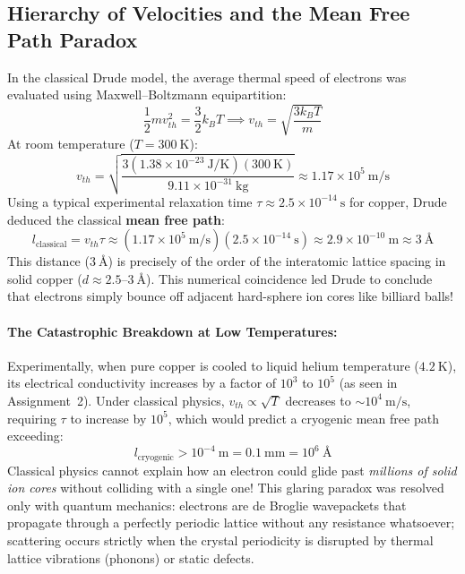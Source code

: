 \documentclass[11pt,a4paper]{article}
\begin{document}
\subsection{Hierarchy of Velocities and the Mean Free Path Paradox}
In the classical Drude model, the average thermal speed of electrons was evaluated using Maxwell--Boltzmann equipartition:
\begin{equation}
\frac{1}{2}m v_{th}^2 = \frac{3}{2}k_B T \implies v_{th} = \sqrt{\frac{3k_B T}{m}}
\label{eq:v_th}
\end{equation}
At room temperature ($T = 300\ \mathrm{K}$):
\begin{equation}
v_{th} = \sqrt{\frac{3(1.38 \times 10^{-23}\ \mathrm{J/K})(300\ \mathrm{K})}{9.11 \times 10^{-31}\ \mathrm{kg}}} \approx 1.17 \times 10^5\ \mathrm{m/s}
\end{equation}
Using a typical experimental relaxation time $\tau \approx 2.5 \times 10^{-14}\ \mathrm{s}$ for copper, Drude deduced the classical \textbf{mean free path}:
\begin{equation}
l_{\mathrm{classical}} = v_{th} \tau \approx (1.17 \times 10^5\ \mathrm{m/s})(2.5 \times 10^{-14}\ \mathrm{s}) \approx 2.9 \times 10^{-10}\ \mathrm{m} \approx 3\ \text{\AA}
\end{equation}
This distance ($3\ \text{\AA}$) is precisely of the order of the interatomic lattice spacing in solid copper ($d \approx 2.5\text{--}3\ \text{\AA}$). This numerical coincidence led Drude to conclude that electrons simply bounce off adjacent hard-sphere ion cores like billiard balls!

\paragraph{The Catastrophic Breakdown at Low Temperatures:}
Experimentally, when pure copper is cooled to liquid helium temperature ($4.2\ \mathrm{K}$), its electrical conductivity increases by a factor of $10^3$ to $10^5$ (as seen in Assignment~2). Under classical physics, $v_{th} \propto \sqrt{T}$ decreases to $\sim 10^4\ \mathrm{m/s}$, requiring $\tau$ to increase by $10^5$, which would predict a cryogenic mean free path exceeding:
\begin{equation}
l_{\mathrm{cryogenic}} > 10^{-4}\ \mathrm{m} = 0.1\ \mathrm{mm} = 10^6\ \text{\AA}
\end{equation}
Classical physics cannot explain how an electron could glide past \emph{millions of solid ion cores} without colliding with a single one! This glaring paradox was resolved only with quantum mechanics: electrons are de Broglie wavepackets that propagate through a perfectly periodic lattice without any resistance whatsoever; scattering occurs strictly when the crystal periodicity is disrupted by thermal lattice vibrations (phonons) or static defects.
\end{document}
